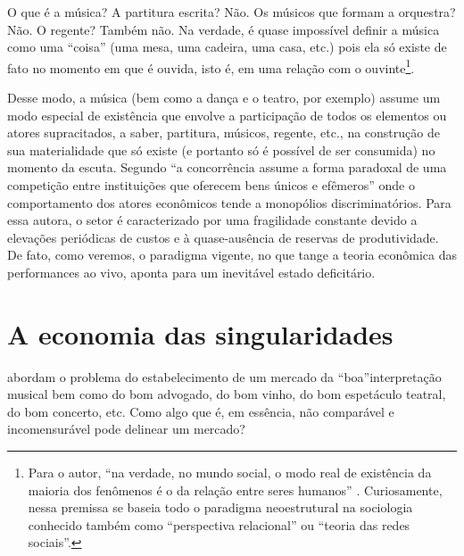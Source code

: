\documentclass[a4paper, 12pt, openright, oneside, german, french, english, brazil]{abntex2}
\begin{document}
	\begin{citacao}
		O que é a música? A partitura escrita? Não. Os músicos que formam a orquestra? Não. O regente? Também não. Na verdade, é quase impossível definir a música como uma ``coisa'' (uma mesa, uma cadeira, uma casa, etc.) pois ela só existe de fato no momento em que é ouvida, isto é, em uma relação com o ouvinte\footnote{Para o autor, ``na verdade, no mundo social, o modo real de existência da maioria dos fenômenos é o da relação entre seres humanos'' \cite[p. 110]{tolila2007cultura}. Curiosamente, nessa premissa se baseia todo o paradigma neoestrutural na sociologia conhecido também como ``perspectiva relacional'' ou ``teoria das redes sociais''.}. \cite[p. 109]{tolila2007cultura}
	\end{citacao}

	Desse modo, a música (bem como a dança e o teatro, por exemplo) assume um modo especial de existência que envolve a participação de todos os elementos ou atores supracitados, a saber, partitura, músicos, regente, etc., na construção de sua materialidade que só existe (e portanto só é possível de ser consumida) no momento da escuta. Segundo  ``a concorrência assume a forma paradoxal de uma competição entre instituições que oferecem bens únicos e efêmeros'' onde o comportamento dos atores econômicos tende a monopólios discriminatórios. Para essa autora, o setor é caracterizado por uma fragilidade constante devido a elevações periódicas de custos e à quase-ausência de reservas de produtividade. De fato, como veremos, o paradigma vigente, no que tange a teoria econômica das performances ao vivo, aponta para um inevitável estado deficitário.
	
	\section{A economia das singularidades}
	
	
	 abordam o problema do estabelecimento de um mercado da ``boa''interpretação musical bem como do bom advogado, do bom vinho, do bom espetáculo teatral, do bom concerto, etc. Como algo que é, em essência, não comparável e incomensurável pode delinear um mercado?
	
\end{document}
